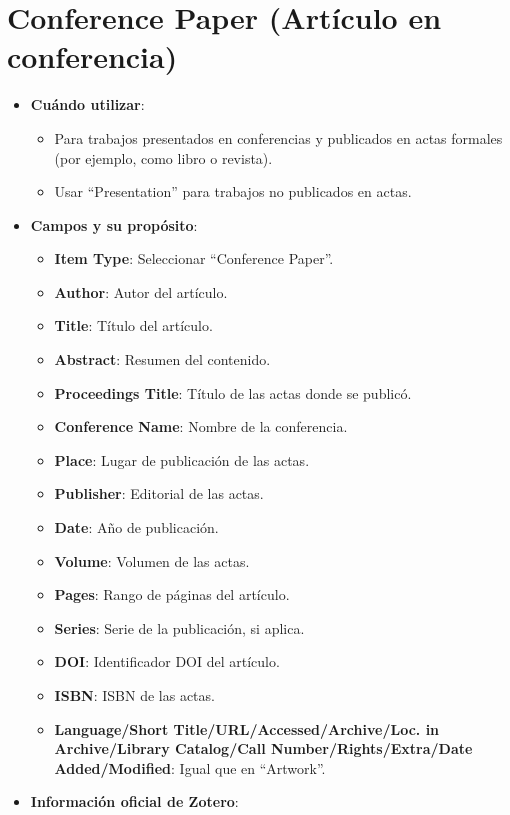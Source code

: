 \documentclass[
  jou,
  floatsintext,
  longtable,
  a4paper,
  nolmodern,
  notxfonts,
  notimes,
  12pt,
  colorlinks=true,linkcolor=blue,citecolor=blue,urlcolor=blue]{apa7}
\providecommand{\tightlist}{%
  \setlength{\itemsep}{0pt}\setlength{\parskip}{0pt}}
\begin{document}
\section{Conference Paper (Artículo en
conferencia)}\label{conference-paper-artuxedculo-en-conferencia}

\begin{itemize}
\tightlist
\item
  \textbf{Cuándo utilizar}:

  \begin{itemize}
  \tightlist
  \item
    Para trabajos presentados en conferencias y publicados en actas
    formales (por ejemplo, como libro o revista).
  \item
    Usar ``Presentation'' para trabajos no publicados en actas.
  \end{itemize}
\item
  \textbf{Campos y su propósito}:

  \begin{itemize}
  \tightlist
  \item
    \textbf{Item Type}: Seleccionar ``Conference Paper''.
  \item
    \textbf{Author}: Autor del artículo.
  \item
    \textbf{Title}: Título del artículo.
  \item
    \textbf{Abstract}: Resumen del contenido.
  \item
    \textbf{Proceedings Title}: Título de las actas donde se publicó.
  \item
    \textbf{Conference Name}: Nombre de la conferencia.
  \item
    \textbf{Place}: Lugar de publicación de las actas.
  \item
    \textbf{Publisher}: Editorial de las actas.
  \item
    \textbf{Date}: Año de publicación.
  \item
    \textbf{Volume}: Volumen de las actas.
  \item
    \textbf{Pages}: Rango de páginas del artículo.
  \item
    \textbf{Series}: Serie de la publicación, si aplica.
  \item
    \textbf{DOI}: Identificador DOI del artículo.
  \item
    \textbf{ISBN}: ISBN de las actas.
  \item
    \textbf{Language/Short Title/URL/Accessed/Archive/Loc. in
    Archive/Library Catalog/Call Number/Rights/Extra/Date
    Added/Modified}: Igual que en ``Artwork''.
  \end{itemize}
\item
  \textbf{Información oficial de Zotero}:


\end{itemize}
\end{document}
